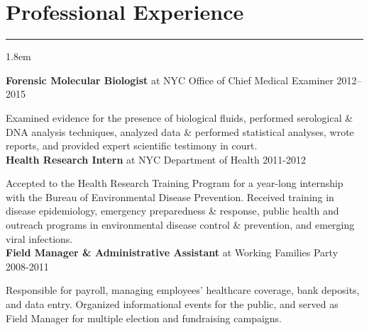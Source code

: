 \documentclass[]{article}
\begin{document}
\section{Professional Experience}
\hrule
\vspace{4mm}
\leftskip 1.8em

\textbf{Forensic Molecular Biologist} at NYC Office of Chief Medical Examiner \hfill 2012--2015
     
Examined evidence for the presence of biological fluids, performed serological \& DNA analysis \linebreak techniques, analyzed data \& performed statistical analyses, wrote reports, and provided expert \linebreak scientific testimony in court.\\
   
\textbf{Health Research Intern} at NYC Department of Health \hfill 2011-2012
     
Accepted to the Health Research Training Program for a year-long internship with the Bureau of \linebreak Environmental Disease Prevention. Received training in disease epidemiology, emergency preparedness \& response, public health and outreach programs in environmental disease control \&  prevention, and emerging viral infections.\\
     
\textbf{Field Manager \& Administrative Assistant} at Working Families Party \hfill 2008-2011
     
Responsible for payroll, managing employees' healthcare coverage, bank deposits, and data entry. \linebreak Organized informational events for the public, and served as Field Manager for multiple election and fundraising campaigns.
\end{document}
